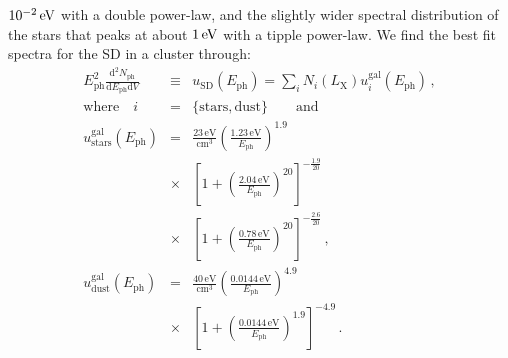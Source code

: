 \documentclass[10pt,aps,pra,reprint,amsmath,amsfonts,amssymb,showpacs]{revtex4-1}
\newcommand{\rmn}{\mathrm}
\newcommand{\ph}{\rmn{ph}}
\newcommand{\eph}{E_\ph}
\newcommand{\gal}{\rmn{gal}}
\newcommand{\sd}{\rmn{SD}}
\newcommand{\stars}{\rmn{stars}}
\newcommand{\dust}{\rmn{dust}}
\newcommand{\lx}{L_\rmn{X}}
\newcommand{\ev}{\rm{eV}}
\newcommand{\dd}{\rmn{d}}
\begin{document}
$10^{-2}\,\ev$ with a double power-law, and the slightly wider
spectral distribution of the stars that peaks at about $1\,\ev$ with a
tipple power-law. We find the best fit spectra for the SD in a
cluster through:
\begin{eqnarray}
  \eph^2\frac{\dd^2 N_\ph}{\dd \eph \dd V}
  &\equiv& u_\sd(\eph) =  \sum_i N_i(\lx) u_i^\gal(\eph)\,,\nonumber \\ 
\rmn{where}\quad i&=&\{\rmn{stars,dust}\} \qquad \rmn{and}\\ 
  u_\stars^\gal(\eph) &=& \frac{23\,\rmn{eV}}{\rmn{cm}^3} 
  \left(\frac{1.23\,\rmn{eV}}{\eph}\right)^{1.9} \nonumber \\
  &\times&\left[1+\left(\frac{2.04\,\rmn{eV}}{\eph}\right)^{20}\right]
  ^{-\frac{1.9}{20}}\nonumber \\
  &\times& \left[1+\left(\frac{0.78\,\rmn{eV}}{\eph}\right)^{20}\right]^{-\frac{2.6}{20}}\,, \\
  u_\dust^\gal(\eph) &=& 
  \frac{40\,\rmn{eV}}{\rmn{cm}^3} 
  \left(\frac{0.0144\,\rmn{eV}}{\eph}\right)^{4.9}\nonumber \\
  &\times& \left[1+\left(\frac{0.0144\,\rmn{eV}}{\eph}\right)^{1.9}\right]^{-4.9}\,.
\end{eqnarray}
\end{document}

